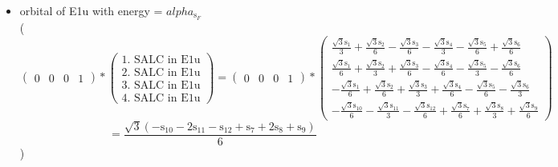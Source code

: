\documentclass[12pt,a4paper]{article}
\begin{document}
\begin{itemize}
\textcolor{red}{Error in Orthogonalization of SALCs}\textcolor{red}{Error in Orthogonalization of SALCs}\textcolor{red}{Error in Orthogonalization of SALCs}\item orbital of E1u with energy = 
                                $alpha_{\text{s}_F}$ \\
( 
$$
\begin{pmatrix}0 & 0 & 0 & 1\end{pmatrix} * \left(\begin{array}{c}\text{1. SALC in E1u} \\ \text{2. SALC in E1u} \\ \text{3. SALC in E1u} \\ \text{4. SALC in E1u}\end{array}\right) = \begin{pmatrix}0 & 0 & 0 & 1\end{pmatrix} * \begin{pmatrix}\frac{\sqrt{3} \text{s}_{1}}{3} + \frac{\sqrt{3} \text{s}_{2}}{6} - \frac{\sqrt{3} \text{s}_{3}}{6} - \frac{\sqrt{3} \text{s}_{4}}{3} - \frac{\sqrt{3} \text{s}_{5}}{6} + \frac{\sqrt{3} \text{s}_{6}}{6}\\\frac{\sqrt{3} \text{s}_{1}}{6} + \frac{\sqrt{3} \text{s}_{2}}{3} + \frac{\sqrt{3} \text{s}_{3}}{6} - \frac{\sqrt{3} \text{s}_{4}}{6} - \frac{\sqrt{3} \text{s}_{5}}{3} - \frac{\sqrt{3} \text{s}_{6}}{6}\\- \frac{\sqrt{3} \text{s}_{1}}{6} + \frac{\sqrt{3} \text{s}_{2}}{6} + \frac{\sqrt{3} \text{s}_{3}}{3} + \frac{\sqrt{3} \text{s}_{4}}{6} - \frac{\sqrt{3} \text{s}_{5}}{6} - \frac{\sqrt{3} \text{s}_{6}}{3}\\- \frac{\sqrt{3} \text{s}_{10}}{6} - \frac{\sqrt{3} \text{s}_{11}}{3} - \frac{\sqrt{3} \text{s}_{12}}{6} + \frac{\sqrt{3} \text{s}_{7}}{6} + \frac{\sqrt{3} \text{s}_{8}}{3} + \frac{\sqrt{3} \text{s}_{9}}{6}\end{pmatrix} 
 $$ $$ = \frac{\sqrt{3} \left(- \text{s}_{10} - 2 \text{s}_{11} - \text{s}_{12} + \text{s}_{7} + 2 \text{s}_{8} + \text{s}_{9}\right)}{6} 
 $$ 
 )


\end{itemize}
\end{document}
